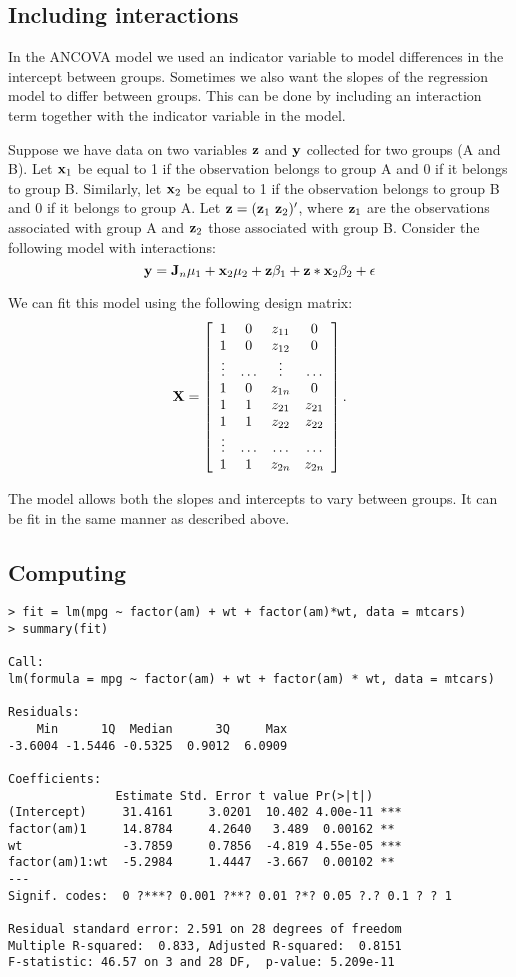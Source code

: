 \subsection{Including interactions}

In the ANCOVA model we used an indicator variable to model differences in the intercept between groups.
Sometimes we also want the slopes of the regression model to differ between groups.
This can be done by including an interaction term together with the indicator variable in the model.

Suppose we have data on two variables $\mathbf{z}$ and $\mathbf{y}$ collected for two groups (A and B). 
Let $\mathbf{x}_1$ be equal to 1 if the observation belongs to group A and 0 if it belongs to group B.
Similarly, let $\mathbf{x}_2$ be equal to 1 if the observation belongs to group B and 0 if it belongs to group A. Let $\mathbf{z} = (\mathbf{z}_1 \, \, \mathbf{z}_2)'$, where $\mathbf{z}_1$ are the observations associated with group A and $\mathbf{z}_2$ those associated with group B.
Consider the following model with interactions:
$$
\mathbf{y} = \mathbf{J}_n \mu_1 + \mathbf{x}_2 \mu_2 + \mathbf{z} \beta_1 + \mathbf{z}*\mathbf{x}_2 \beta_2 + \epsilon
$$

We can fit this model using the following design matrix:
$$
\mathbf{X} =
\left[
\begin{array}{cccc}
1 & 0  & z_{11}  & 0\\
1 & 0  & z_{12}  & 0\\
\vdots &  \ldots  & \vdots & \ldots\\
1  & 0 & z_{1n}   & 0\\
1  & 1 & z_{21}  & z_{21}\\
1  & 1 & z_{22} & z_{22}\\
\vdots & \ldots & \ldots & \ldots\\
1  & 1 & z_{2n} & z_{2n}
\end{array}
\right]
.
$$

The model allows both the slopes and intercepts to vary between groups.
It can be fit in the same manner as described above.

\subsection{Computing}

\begin{verbatim}
> fit = lm(mpg ~ factor(am) + wt + factor(am)*wt, data = mtcars)
> summary(fit)

Call:
lm(formula = mpg ~ factor(am) + wt + factor(am) * wt, data = mtcars)

Residuals:
    Min      1Q  Median      3Q     Max 
-3.6004 -1.5446 -0.5325  0.9012  6.0909 

Coefficients:
               Estimate Std. Error t value Pr(>|t|)    
(Intercept)     31.4161     3.0201  10.402 4.00e-11 ***
factor(am)1     14.8784     4.2640   3.489  0.00162 ** 
wt              -3.7859     0.7856  -4.819 4.55e-05 ***
factor(am)1:wt  -5.2984     1.4447  -3.667  0.00102 ** 
---
Signif. codes:  0 ?***? 0.001 ?**? 0.01 ?*? 0.05 ?.? 0.1 ? ? 1

Residual standard error: 2.591 on 28 degrees of freedom
Multiple R-squared:  0.833,	Adjusted R-squared:  0.8151 
F-statistic: 46.57 on 3 and 28 DF,  p-value: 5.209e-11
\end{verbatim}

